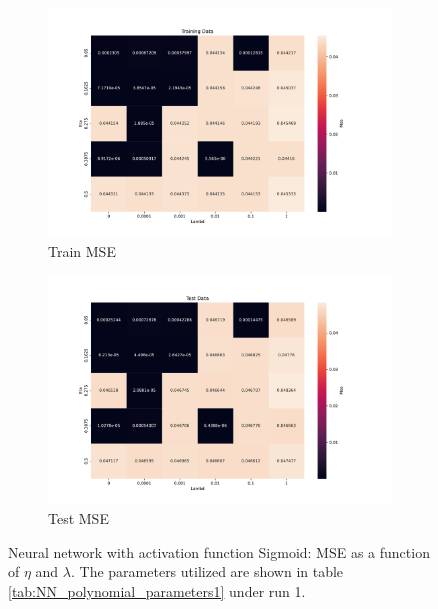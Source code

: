 \begin{figure}[htpb]
\begin{subfigure}{.5\textwidth}
  \centering
  \includegraphics[width=1.1\linewidth]{Figures/PartB/train_sigmoid_MSE(eta,lmb)}
  \caption{Train MSE}
  \label{fig:train_sigmoid_MSE-eta-lmb-}
\end{subfigure}%
\begin{subfigure}{.5\textwidth}
  \centering
  \includegraphics[width=1.1\linewidth]{Figures/PartB/test_sigmoid_MSE(eta,lmb)}
  \caption{Test MSE}
  \label{fig:test_sigmoid_MSE-eta-lmb-}
\end{subfigure}
\caption{Neural network with activation function Sigmoid: MSE as a function of \(\eta \) and \(\lambda \).
The parameters utilized are shown in table \ref{tab:NN_polynomial_parameters1} under run 1.}
\label{fig:Sigmoid_MSE}
\end{figure}

